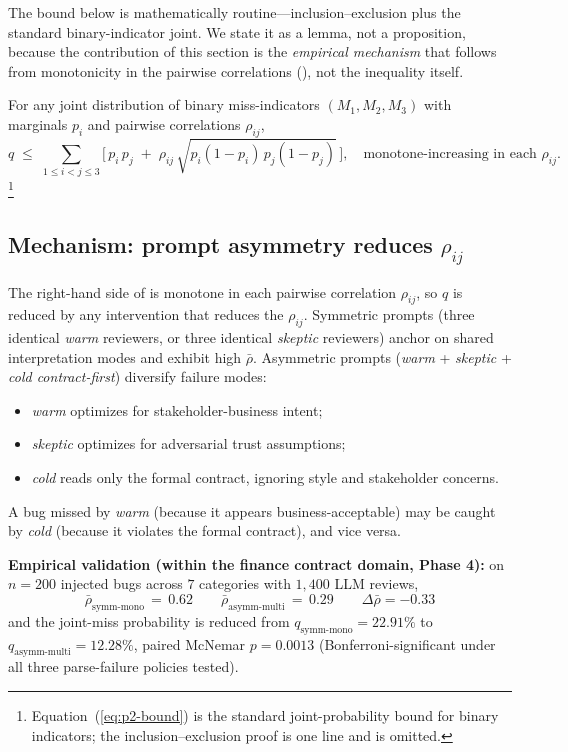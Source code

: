 The bound below is mathematically routine---inclusion--exclusion plus the standard binary-indicator joint. We state it as a lemma, not a proposition, because the contribution of this section is the \emph{empirical mechanism} that follows from monotonicity in the pairwise correlations (), not the inequality itself.

For any joint distribution of binary miss-indicators $(M_1, M_2, M_3)$ with marginals $p_i$ and pairwise correlations $\rho_{ij}$,
\begin{equation}
  q \;\le\; \sum_{1 \le i < j \le 3}\!\Big[\, p_i\, p_j \;+\; \rho_{ij}\,\sqrt{p_i (1 - p_i)\, p_j (1 - p_j)}\,\Big],\quad
  \text{monotone-increasing in each $\rho_{ij}$.}
  \label{eq:p2-bound}
\end{equation}
\footnote{Equation~(\ref{eq:p2-bound}) is the standard joint-probability bound for binary indicators; the inclusion--exclusion proof is one line and is omitted.}

\subsection{Mechanism: prompt asymmetry reduces \texorpdfstring{$\rho_{ij}$}{rho\_ij}}
\label{sec:p2-mechanism}

The right-hand side of  is monotone in each pairwise correlation $\rho_{ij}$, so $q$ is reduced by any intervention that reduces the $\rho_{ij}$. Symmetric prompts (three identical \emph{warm} reviewers, or three identical \emph{skeptic} reviewers) anchor on shared interpretation modes and exhibit high $\bar{\rho}$. Asymmetric prompts (\emph{warm} + \emph{skeptic} + \emph{cold contract-first}) diversify failure modes:
\begin{itemize}[leftmargin=2em]
  \item \emph{warm} optimizes for stakeholder-business intent;
  \item \emph{skeptic} optimizes for adversarial trust assumptions;
  \item \emph{cold} reads only the formal contract, ignoring style and stakeholder concerns.
\end{itemize}
A bug missed by \emph{warm} (because it appears business-acceptable) may be caught by \emph{cold} (because it violates the formal contract), and vice versa.

\textbf{Empirical validation (within the finance contract domain, Phase 4):} on $n = 200$ injected bugs across $7$ categories with $1{,}400$ LLM reviews,
\[
\bar{\rho}_{\mathrm{symm\text{-}mono}} \,=\, 0.62
\qquad
\bar{\rho}_{\mathrm{asymm\text{-}multi}} \,=\, 0.29
\qquad
\Delta\bar{\rho} = -0.33
\]
and the joint-miss probability is reduced from $q_{\mathrm{symm\text{-}mono}} = 22.91\%$ to $q_{\mathrm{asymm\text{-}multi}} = 12.28\%$, paired McNemar $p = 0.0013$ (Bonferroni-significant under all three parse-failure policies tested).

